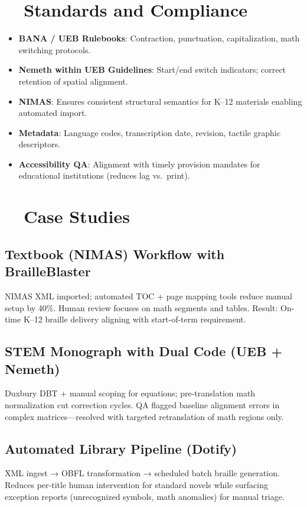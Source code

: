 \section{~~Standards and Compliance}
\label{sec:braille-standards}
\begin{itemize}
	\item \textbf{BANA / UEB Rulebooks}: Contraction, punctuation, capitalization, math switching protocols.
	\item \textbf{Nemeth within UEB Guidelines}: Start/end switch indicators; correct retention of spatial alignment.
	\item \textbf{NIMAS}: Ensures consistent structural semantics for K–12 materials enabling automated import.
	\item \textbf{Metadata}: Language codes, transcription date, revision, tactile graphic descriptors.
	\item \textbf{Accessibility QA}: Alignment with timely provision mandates for educational institutions (reduces lag vs.\ print).
\end{itemize}

\section{~~Case Studies}
\label{sec:braille-case-studies}
\subsection*{Textbook (NIMAS) Workflow with BrailleBlaster}
NIMAS XML imported; automated TOC + page mapping tools reduce manual setup by 40\%. Human review focuses on math segments and tables. Result: On-time K–12 braille delivery aligning with start-of-term requirement.

\subsection*{STEM Monograph with Dual Code (UEB + Nemeth)}
Duxbury DBT + manual scoping for equations; pre-translation math normalization cut correction cycles. QA flagged baseline alignment errors in complex matrices—resolved with targeted retranslation of math regions only.

\subsection*{Automated Library Pipeline (Dotify)}
XML ingest → OBFL transformation → scheduled batch braille generation. Reduces per-title human intervention for standard novels while surfacing exception reports (unrecognized symbols, math anomalies) for manual triage.

